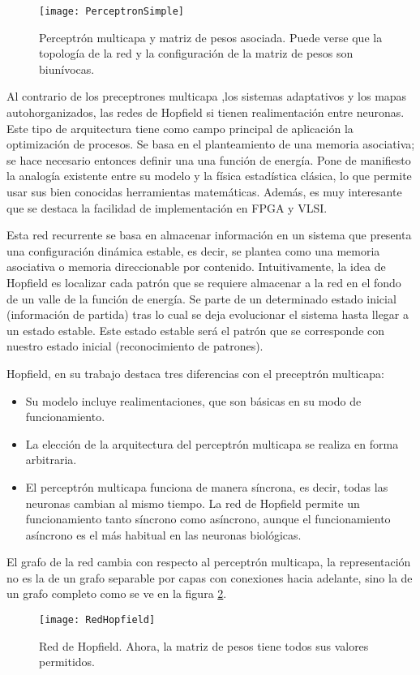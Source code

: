 \begin{figure}
	\centering
	\texttt{[image: PerceptronSimple]}\\
	\caption{Perceptrón multicapa y matriz de pesos asociada. Puede verse que la topología de la red y la configuración de la matriz de pesos son biunívocas.}\label{fig:PerceptronSimple}
\end{figure}

Al contrario de los preceptrones multicapa ,los sistemas adaptativos y los mapas autohorganizados, las redes de Hopfield si tienen realimentación entre neuronas.
Este tipo de arquitectura tiene como campo principal de aplicación la optimización de procesos.
Se basa en el planteamiento de una memoria asociativa; se hace necesario entonces definir una una función de energía.
Pone de manifiesto la analogía existente entre su modelo y la física estadística clásica, lo que permite usar sus bien conocidas herramientas matemáticas.
Además, es muy interesante que se destaca la facilidad de implementación en FPGA y VLSI.

Esta red recurrente se basa en almacenar información en un sistema que presenta una configuración dinámica estable, es decir, se plantea como una memoria asociativa o memoria direccionable por contenido.
Intuitivamente, la idea de Hopfield es localizar cada patrón que se requiere almacenar a la red en el fondo de un valle de la función de energía.
Se parte de un determinado estado inicial (información de partida) tras lo cual se deja evolucionar el sistema hasta llegar a un estado estable.
Este estado estable será el patrón que se corresponde con nuestro estado inicial (reconocimiento de patrones).

Hopfield, en su trabajo destaca tres diferencias con el preceptrón multicapa:
\begin{itemize}
		\item Su modelo incluye realimentaciones, que son básicas en su modo de funcionamiento.
		\item La elección de la arquitectura del perceptrón multicapa se realiza en forma arbitraria.
		\item El perceptrón multicapa funciona de manera síncrona, es decir, todas las neuronas cambian al mismo tiempo. La red de Hopfield permite un funcionamiento tanto síncrono como asíncrono, aunque el funcionamiento asíncrono es el más habitual en las neuronas biológicas.
\end{itemize}

El grafo de la red cambia con respecto al perceptrón multicapa, la representación no es la de un grafo separable por capas con conexiones hacia adelante, sino la de un grafo completo como se ve en la figura \ref{fig:RedHopfield}.
\begin{figure}
	\centering
	\texttt{[image: RedHopfield]}\\
	\caption{Red de Hopfield. Ahora, la matriz de pesos tiene todos sus valores permitidos.}\label{fig:RedHopfield}
\end{figure}

